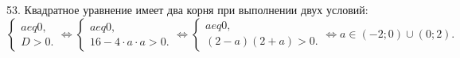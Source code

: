 53. Квадратное уравнение имеет два корня при выполнении двух условий:\\ $\begin{cases}a
eq0,\\ D>0.\end{cases}\Leftrightarrow
\begin{cases}a
eq0,\\ 16-4\cdot a \cdot a>0.\end{cases}\Leftrightarrow
\begin{cases}a
eq0,\\ (2-a)(2+a)>0.\end{cases}\Leftrightarrow a\in(-2;0)\cup(0;2).$\\
